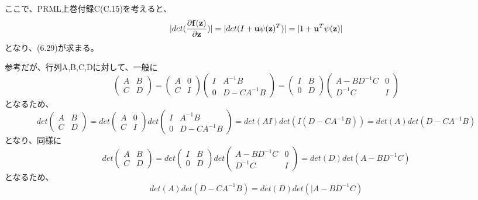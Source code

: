 ﻿\documentclass{jsarticle}
\begin{document}
ここで、PRML上巻付録C(C.15)を考えると、
\begin{equation}
|det (\frac{\partial{\bf f}({\bf z})}{\partial {\bf z}})| = |det(I + {\bf u} \psi({\bf z})^T)|
= |1 + {\bf u}^T \psi({\bf z})|
\end{equation}
となり、(6.29)が求まる。

参考だが、行列A,B,C,Dに対して、一般に
\begin{equation}
\begin{pmatrix}
A & B\\
C & D
\end{pmatrix}
=
\begin{pmatrix}
A & 0\\
C & I
\end{pmatrix}
\begin{pmatrix}
I & A^{-1}B\\
0 & D-CA^{-1}B
\end{pmatrix}
=
\begin{pmatrix}
I & B\\
0 & D
\end{pmatrix}
\begin{pmatrix}
A - BD^{-1}C & 0\\
D^{-1}C & I
\end{pmatrix}
\end{equation}
となるため、
\begin{equation}
det \begin{pmatrix}
A & B\\
C & D
\end{pmatrix}
=
det \begin{pmatrix}
A & 0\\
C & I
\end{pmatrix}
det
\begin{pmatrix}
I & A^{-1}B\\
0 & D-CA^{-1}B
\end{pmatrix}
=det(AI)det(I(D-CA^{-1}B))
=det(A)det(D-CA^{-1}B)
\end{equation}
となり、同様に
\begin{equation}det
\begin{pmatrix}
A & B\\
C & D
\end{pmatrix}
=
det \begin{pmatrix}
I & B\\
0 & D
\end{pmatrix}
det
\begin{pmatrix}
A - BD^{-1}C & 0\\
D^{-1}C & I
\end{pmatrix}
=det(D)det(A - BD^{-1}C)
\end{equation}
となるため、
\begin{equation}
det(A)det(D-CA^{-1}B) = det(D)det(|A - BD^{-1}C)
\end{equation}
\end{document}
